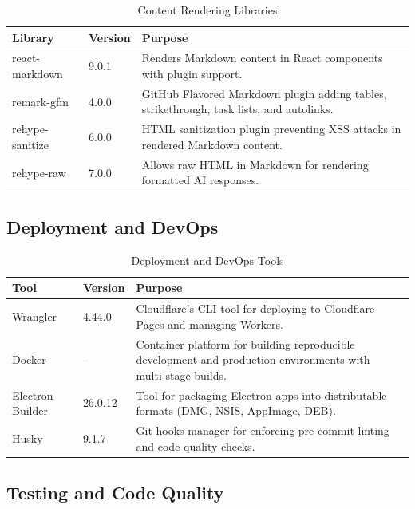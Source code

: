 \documentclass[12pt,a4paper,openany]{report}
\begin{document}
\begin{table}[H]
\centering
\caption{Content Rendering Libraries}
\label{tab:markdown-libs}
\begin{tabular}{|p{3.5cm}|p{2cm}|p{6.5cm}|}
\hline
\textbf{Library} & \textbf{Version} & \textbf{Purpose} \\
\hline
react-markdown & 9.0.1 & Renders Markdown content in React components with plugin support. \\
\hline
remark-gfm & 4.0.0 & GitHub Flavored Markdown plugin adding tables, strikethrough, task lists, and autolinks. \\
\hline
rehype-sanitize & 6.0.0 & HTML sanitization plugin preventing XSS attacks in rendered Markdown content. \\
\hline
rehype-raw & 7.0.0 & Allows raw HTML in Markdown for rendering formatted AI responses. \\
\hline
\end{tabular}
\end{table}

\subsection{Deployment and DevOps}

\begin{table}[H]
\centering
\caption{Deployment and DevOps Tools}
\label{tab:devops}
\begin{tabular}{|p{3.5cm}|p{2cm}|p{6.5cm}|}
\hline
\textbf{Tool} & \textbf{Version} & \textbf{Purpose} \\
\hline
Wrangler & 4.44.0 & Cloudflare's CLI tool for deploying to Cloudflare Pages and managing Workers. \\
\hline
Docker & -- & Container platform for building reproducible development and production environments with multi-stage builds. \\
\hline
Electron Builder & 26.0.12 & Tool for packaging Electron apps into distributable formats (DMG, NSIS, AppImage, DEB). \\
\hline
Husky & 9.1.7 & Git hooks manager for enforcing pre-commit linting and code quality checks. \\
\hline
\end{tabular}
\end{table}

\subsection{Testing and Code Quality}
\end{document}
